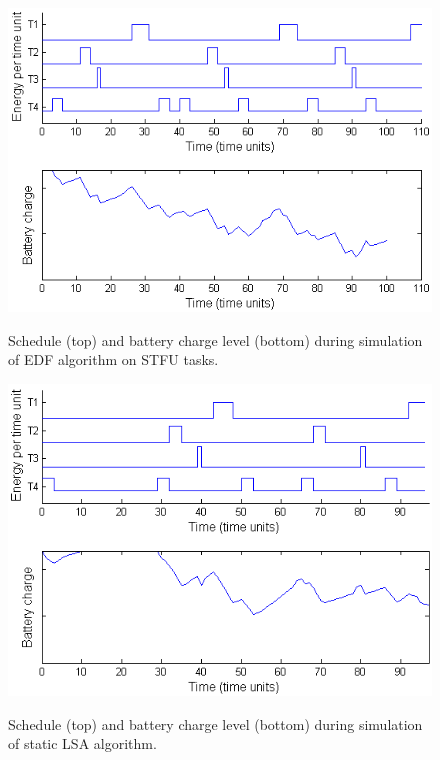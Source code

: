 \begin{figure}
\begin{center}
\includegraphics[scale=0.57]{edfstfubattery.png}
\label{fig:edfstfubattery}
\caption{Schedule (top) and battery charge level (bottom) during simulation of EDF algorithm on STFU tasks.}
\end{center}
\end{figure}

\begin{figure}
\begin{center}
\includegraphics[scale=0.57]{lsabattery.png}
\label{fig:lsabattery}
\caption{Schedule (top) and battery charge level (bottom) during simulation of static LSA algorithm.}
\end{center}
\end{figure}

